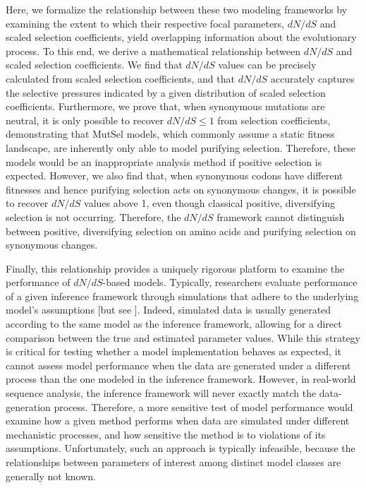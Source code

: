 \documentclass[11pt]{article}
\begin{document}
Here, we formalize the relationship between these two modeling frameworks by examining the extent to which their respective focal parameters, $dN/dS$ and scaled selection coefficients, yield overlapping information about the evolutionary process. To this end, we derive a mathematical relationship between $dN/dS$ and scaled selection coefficients. We find that $dN/dS$ values can be precisely calculated from scaled selection coefficients, and that $dN/dS$ accurately captures the selective pressures indicated by a given distribution of scaled selection coefficients. Furthermore, we prove that, when synonymous mutations are neutral, it is only possible to recover $dN/dS \leq 1$ from selection coefficients, demonstrating that MutSel models, which commonly assume a static fitness landscape, are inherently only able to model purifying selection. Therefore, these models would be an inappropriate analysis method if positive selection is expected. However, we also find that, when synonymous codons have different fitnesses and hence purifying selection acts on synonymous changes, it is possible to recover $dN/dS$ values above 1, even though classical positive, diversifying selection is not occurring. Therefore, the $dN/dS$ framework cannot distinguish between positive, diversifying selection on amino acids and purifying selection on synonymous changes.

Finally, this relationship provides a uniquely rigorous platform to examine the performance of $dN/dS$-based models. Typically, researchers evaluate performance of a given inference framework through simulations that adhere to the underlying model's assumptions [but see \citet{Schoniger1995, Mininetal2003, Holder2008, Yap2010, Rubinsteinetal2011}]. Indeed, simulated data is usually generated according to the same model as the inference framework, allowing for a direct comparison between the true and estimated parameter values. While this strategy is critical for testing whether a model implementation behaves as expected, it cannot assess model performance when the data are generated under a different process than the one modeled in the inference framework. However, in real-world sequence analysis, the inference framework will never exactly match the data-generation process. Therefore, a more sensitive test of model performance would examine how a given method performs when data are simulated under different mechanistic processes, and how sensitive the method is to violations of its assumptions. Unfortunately, such an approach is typically infeasible, because the relationships between parameters of interest among distinct model classes are generally not known.
\end{document}
